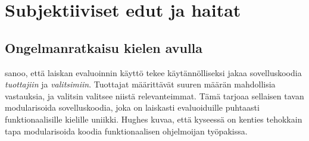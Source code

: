 

\section{Subjektiiviset edut ja haitat} \label{subjektiiviset-edut}

\subsection{Ongelmanratkaisu kielen avulla}
\citet{hughes1989functional} sanoo, että laiskan evaluoinnin käyttö tekee käytännölliseksi jakaa sovelluskoodia \textit{tuottajiin} ja \textit{valitsimiin}. Tuottajat määrittävät suuren määrän mahdollisia vastauksia, ja valitsin valitsee niistä relevanteimmat. Tämä tarjoaa sellaisen tavan modularisoida sovelluskoodia, joka on laiskasti evaluoiduille puhtaasti funktionaalisille kielille uniikki. Hughes kuvaa, että kyseessä on kenties tehokkain tapa modularisoida koodia funktionaalisen ohjelmoijan työpakissa.

